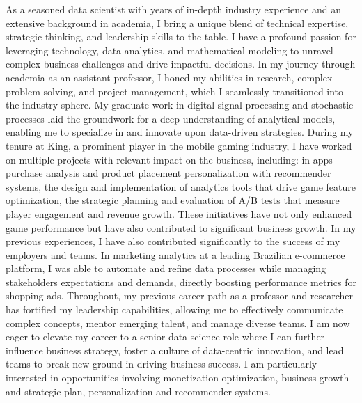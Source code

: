 


As a seasoned data scientist with years of in-depth industry experience and an extensive background in academia, 
I bring a unique blend of technical expertise, strategic thinking, and leadership skills to the table. 
I have a profound passion for leveraging technology, data analytics, and mathematical modeling 
to unravel complex business challenges and drive impactful decisions.
%
In my journey through academia as an assistant professor, 
I honed my abilities in research, complex problem-solving, and project management, 
which I seamlessly transitioned into the industry sphere. 
My graduate work in digital signal processing and stochastic processes laid the groundwork for a deep understanding of analytical models, 
enabling me to specialize in and innovate upon data-driven strategies.
%
During my tenure at King, a prominent player in the mobile gaming industry, 
I have worked on multiple projects with relevant impact on the business, including: 
in-apps purchase analysis and product placement personalization with recommender systems, 
the design and implementation of analytics tools that drive game feature optimization, 
the strategic planning and evaluation of A/B tests that measure player engagement and revenue growth. 
These initiatives have not only enhanced game performance but have also contributed to significant business growth.
%
In my previous experiences, I have also contributed significantly to the success of my employers and teams.
In marketing analytics at a leading Brazilian e-commerce platform, 
I was able to automate and refine data processes while managing stakeholders expectations and demands,
directly boosting performance metrics for shopping ads. 
Throughout, my previous career path as a professor and researcher has fortified my leadership capabilities, 
allowing me to effectively communicate complex concepts, mentor emerging talent, and manage diverse teams.
%
I am now eager to elevate my career to a senior data science role where I can further influence business strategy, 
foster a culture of data-centric innovation, and lead teams to break new ground in driving business success.
I am particularly interested in opportunities involving monetization optimization, business growth and strategic plan, personalization and recommender systems. 